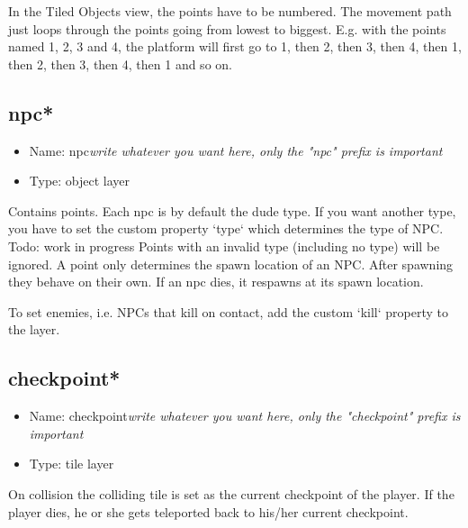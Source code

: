 \documentclass{article}
\begin{document}
In the Tiled Objects view, the points have to be numbered. The movement path just loops through the points going from lowest to biggest. E.g. with the points named 1, 2, 3 and 4, the platform will first go to 1, then 2, then 3, then 4, then 1, then 2, then 3, then 4, then 1 and so on.

\subsection{npc*}
\begin{itemize}
	\item Name: npc\textit{write whatever you want here, only the "npc" prefix is important}
	\item Type: object layer
\end{itemize}

Contains points. Each npc is by default the dude type. If you want another type, you have to set the custom property `type` which determines the type of NPC. Todo: work in progress
Points with an invalid type (including no type) will be ignored.
A point only determines the spawn location of an NPC. After spawning they behave on their own. If an npc dies, it respawns at its spawn location.

To set enemies, i.e. NPCs that kill on contact, add the custom `kill` property to the layer.

\subsection{checkpoint*}
\begin{itemize}
	\item Name: checkpoint\textit{write whatever you want here, only the "checkpoint" prefix is important}
	\item Type: tile layer
\end{itemize}

On collision the colliding tile is set as the current checkpoint of the player. If the player dies, he or she gets teleported back to his/her current checkpoint.
\end{document}
